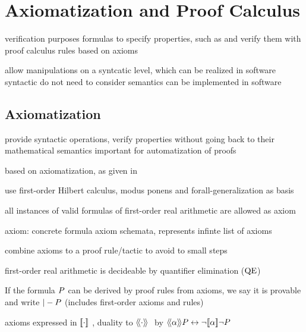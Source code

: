 \chapter{Axiomatization and Proof Calculus}
\label{ch:axiomatization-proof-calculus}


verification purposes
\ddL formulas to specify properties, such as
and verify them with proof calculus
rules based on axioms

allow manipulations on a syntcatic level, which can be realized in software
syntactic
do not need to consider semantics
can be implemented in software

\section{Axiomatization}
    \label{sec:axioms}


    provide syntactic operations, verify properties without going back to their mathematical semantics
    important for automatization of proofs

    based on \dL axiomatization, as given in \cite{Platzer12Complete}

    use first-order Hilbert calculus, modus ponens and forall-generalization as basis

    all instances of valid formulas of first-order real arithmetic are allowed as axiom

    axiom: concrete formula
    axiom schemata, represents infinte list of axioms

    combine axioms to a proof rule/tactic
    to avoid to small steps

    first-order real arithmetic is decideable by quantifier elimination ($\operatorname{QE}$)

    If the \ddL formula $P$ can be derived by \ddL proof rules from \ddL axioms, we say it is provable and write $|-P$
    (includes first-order axioms and rules)

    axioms expressed in $\dbox{\cdot}$, duality to $\ddiamond{\cdot}$ by $\ddiamond{\asprg}{\asfml}\lbisubjunct\lnot\dbox{\asprg}{\lnot\asfml}$


